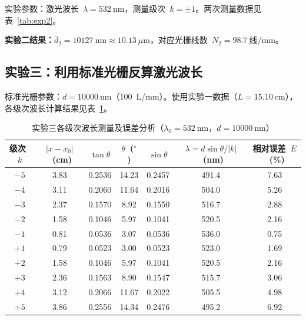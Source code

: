 \documentclass[12pt, a4paper]{article}
\begin{document}
实验参数：激光波长~$\lambda = 532~\text{nm}$，测量级次~$k = \pm1$。两次测量数据见表~\ref{tab:exp2}。

\begin{table}[H]
  \centering
  \caption{实验二测量数据及光栅常数计算结果}
  \label{tab:exp2}
\end{table}

\textbf{实验二结果：}$\bar{d}_2 = 10127~\text{nm} \approx 10.13~\mu\text{m}$，对应光栅线数~$N_2 = 98.7~\text{线/mm}$。

\subsection{实验三：利用标准光栅反算激光波长}

标准光栅参数：$d = 10000~\text{nm}$（100~L/mm）。使用实验一数据（$L = 15.10~\text{cm}$），各级次波长计算结果见表~\ref{tab:exp3}。

\begin{table}[H]
  \centering
  \caption{实验三各级次波长测量及误差分析（$\lambda_0 = 532~\text{nm}$，$d = 10000~\text{nm}$）}
  \label{tab:exp3}
  \small
  \begin{tabular}{ccccccc}
    \toprule
    级次~$k$ & $|x-x_0|$~(cm) & $\tan\theta$ & $\theta$~($^\circ$) & $\sin\theta$ &
    $\lambda = d\sin\theta/|k|$~(nm) & 相对误差~$E$~(\%) \\
    \midrule
    $-5$ & 3.83 & 0.2536 & 14.23 & 0.2457 & 491.4 & 7.63 \\
    $-4$ & 3.11 & 0.2060 & 11.64 & 0.2016 & 504.0 & 5.26 \\
    $-3$ & 2.37 & 0.1570 &  8.92 & 0.1550 & 516.7 & 2.88 \\
    $-2$ & 1.58 & 0.1046 &  5.97 & 0.1041 & 520.5 & 2.16 \\
    $-1$ & 0.81 & 0.0536 &  3.07 & 0.0536 & 536.0 & 0.75 \\
    $+1$ & 0.79 & 0.0523 &  3.00 & 0.0523 & 523.0 & 1.69 \\
    $+2$ & 1.58 & 0.1046 &  5.97 & 0.1041 & 520.5 & 2.16 \\
    $+3$ & 2.36 & 0.1563 &  8.90 & 0.1547 & 515.7 & 3.06 \\
    $+4$ & 3.12 & 0.2066 & 11.67 & 0.2022 & 505.5 & 4.98 \\
    $+5$ & 3.86 & 0.2556 & 14.34 & 0.2476 & 495.2 & 6.92 \\
    \bottomrule
  \end{tabular}
\end{table}
\end{document}
